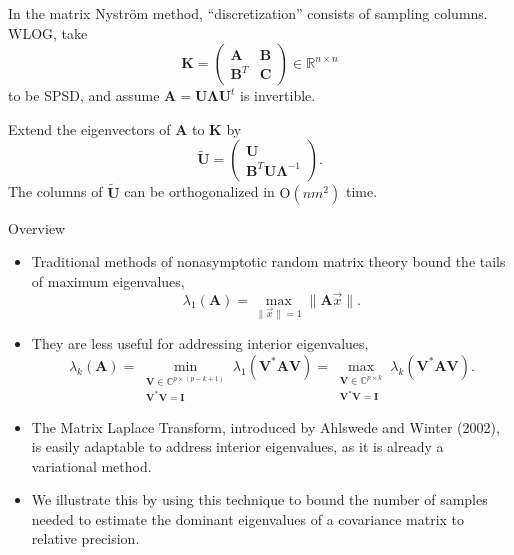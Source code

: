 \documentclass[xcolor={svgnames,pdftex,dvipsnames,table},10pt]{beamer} %
\newcommand{\mat}[1]{\ensuremath{\mathbf{#1}}}
\renewcommand{\star}{*}
\newcommand{\E}{\ensuremath{\mathbb{E}}}
\newcommand{\C}{\ensuremath{\mathbb{C}}}
\newcommand{\R}{\ensuremath{\mathbb{R}}}
\begin{document}
\begin{frame}
 In the matrix Nystr\"om method, ``discretization'' consists of sampling columns. WLOG, take
\[
 \mat{K} = \begin{pmatrix} \mat{A} & \mat{B} \\ \mat{B}^T & \mat{C} \end{pmatrix} \in \R^{n \times n} 
\]
to be SPSD, and assume $\mat{A} = \mat{U} \mat{\Lambda} \mat{U}^t$ is invertible.

Extend the eigenvectors of $\mat{A}$ to $\mat{K}$ by
\[
 \tilde{\mat{U}} = \begin{pmatrix} \mat{U} \\ \mat{B}^T \mat{U} \mat{\Lambda}^{-1} \end{pmatrix}.
\]
The columns of $\tilde{\mat{U}}$ can be orthogonalized in $\mathrm{O}(nm^2)$ time. 
\end{frame}

\begin{frame}{Overview}
\begin{itemize}
 \item Traditional methods of nonasymptotic random matrix theory bound the tails of maximum eigenvalues,
\[
\lambda_1(\mat{A}) = \max_{\|\vec{x}\|=1} \|\mat{A} \vec{x}\|.
\]
 \item They are less useful for addressing interior eigenvalues,
\[
\lambda_k(\mat{A}) = \min_{\substack{ \mat{V} \in \C^{p \times (p-k+1)} \\ \mat{V}^\star\mat{V}=\mat{I}}} \lambda_1(\mat{V}^\star  \mat{A} \mat{V})
 = \max_{\substack{ \mat{V} \in \C^{p \times k} \\ \mat{V}^\star\mat{V}=\mat{I}}} \lambda_k(\mat{V}^\star \mat{A} \mat{V}).
\]
 \item The Matrix Laplace Transform, introduced by Ahlswede and Winter (2002), is easily adaptable to address interior eigenvalues, as it is already a variational method.
 \item We illustrate this by using this technique to bound the number of samples needed to estimate the dominant eigenvalues of a covariance matrix to relative precision.
\end{itemize}
\end{frame}

\end{document}
